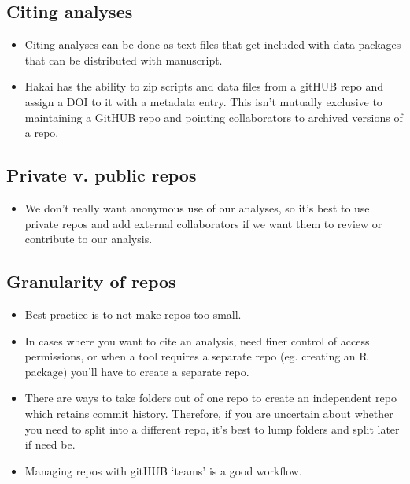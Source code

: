 \documentclass[]{book}
\providecommand{\tightlist}{%
  \setlength{\itemsep}{0pt}\setlength{\parskip}{0pt}}
\begin{document}
\subsection{Citing analyses}\label{citing-analyses}

\begin{itemize}
\item
  Citing analyses can be done as text files that get included with data
  packages that can be distributed with manuscript.
\item
  Hakai has the ability to zip scripts and data files from a gitHUB repo
  and assign a DOI to it with a metadata entry. This isn't mutually
  exclusive to maintaining a GitHUB repo and pointing collaborators to
  archived versions of a repo.
\end{itemize}

\subsection{Private v. public repos}\label{private-v.-public-repos}

\begin{itemize}
\tightlist
\item
  We don't really want anonymous use of our analyses, so it's best to
  use private repos and add external collaborators if we want them to
  review or contribute to our analysis.
\end{itemize}

\subsection{Granularity of repos}\label{granularity-of-repos}

\begin{itemize}
\item
  Best practice is to not make repos too small.
\item
  In cases where you want to cite an analysis, need finer control of
  access permissions, or when a tool requires a separate repo (eg.
  creating an R package) you'll have to create a separate repo.
\item
  There are ways to take folders out of one repo to create an
  independent repo which retains commit history. Therefore, if you are
  uncertain about whether you need to split into a different repo, it's
  best to lump folders and split later if need be.
\item
  Managing repos with gitHUB `teams' is a good workflow.
\end{itemize}
\end{document}
